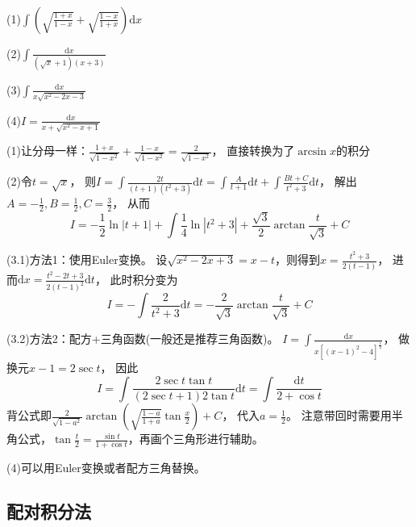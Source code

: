 ~

\begin{exercise}[其他特别经典的根式积分问题]
  (1)$\int \left( \sqrt{\frac{1+x}{1-x}} + \sqrt{\frac{1-x}{1+x}} \right)\mathrm{d}x $

  (2)$\int \frac{\mathrm{d} x}{(\sqrt{x} + 1)(x + 3)}$

  (3)$\int \frac{\mathrm{d} x}{x \sqrt{x^2 - 2x - 3}}$

  (4)$I = \frac{\mathrm{d} x}{x + \sqrt{x^2 - x + 1}}$
\end{exercise}

\begin{solution}
  (1)让分母一样：$\frac{1+x}{\sqrt{1-x^2}} + \frac{1-x}{\sqrt{1-x^2}} = \frac{2}{\sqrt{1-x^2}}$，
  直接转换为了$\arcsin x$的积分

  (2)令$t = \sqrt{x}$，
  则$I = \int \frac{2t}{(t+1)(t^2 + 3)}\mathrm{d} t = \int \frac{A}{t+1}\mathrm{d} t + \int \frac{Bt + C}{t^2 + 3}\mathrm{d}t$，
  解出$A = - \frac{1}{2}, B = \frac{1}{2}, C = \frac{3}{2}$，
  从而
  \begin{equation*}
    I = - \frac{1}{2} \ln |t+1| + \int \frac{1}{4} \ln|t^2 + 3| + \frac{\sqrt{3}}{2} \arctan \frac{t}{\sqrt{3}} + C
  \end{equation*}

  (3.1)方法1：使用Euler变换。
  设$\sqrt{x^2 - 2x + 3} = x - t$，则得到$x = \frac{t^2 + 3}{2(t-1)}$，
  进而$\mathrm{d} x = \frac{t^2 - 2t + 3}{2(t-1)^2}\mathrm{d}t$，
  此时积分变为
  \begin{equation*}
    I = - \int \frac{2}{t^2 + 3} \mathrm{d} t  = - \frac{2}{\sqrt{3}} \arctan \frac{t}{\sqrt{3}} + C
  \end{equation*}

  (3.2)方法2：配方+三角函数(一般还是推荐三角函数)。
  $I = \int \frac{\mathrm{d} x}{x \left[ (x-1)^2 - 4 \right]^{\frac{1}{2}}}$，
  做换元$x - 1 = 2 \sec t$，
  因此
  \begin{equation*}
    I = \int \frac{2 \sec t \tan t}{(2 \sec t + 1) 2 \tan t}\mathrm{d} t = \int \frac{\mathrm{d} t}{2 + \cos t}
  \end{equation*}
  背公式即$\frac{2}{\sqrt{1-a^2}} \arctan \left( \sqrt{\frac{1-a}{1+a}}\tan \frac{x}{2} \right) + C$，
  代入$a = \frac{1}{2}$。
  注意带回时需要用半角公式，$\tan \frac{t}{2} = \frac{\sin t}{1 + \cos t}$，再画个三角形进行辅助。

  (4)可以用Euler变换或者配方三角替换。
\end{solution}

\subsection{配对积分法}

